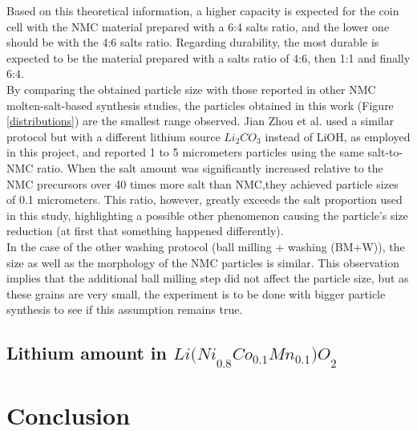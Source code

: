 \documentclass{article}
\begin{document}
Based on this theoretical information, a higher capacity is expected for the coin cell with the NMC material prepared with a 6:4 salts ratio, and the lower one should be with the 4:6 salts ratio. Regarding durability, the most durable is expected to be the material prepared with a salts ratio of 4:6, then 1:1 and finally 6:4.\\

By comparing the obtained particle size with those reported in other NMC molten-salt-based synthesis studies, the particles obtained in this work (Figure \ref{distributions}) are the smallest range observed. Jian Zhou et al. used a similar protocol but with a different lithium source \(Li_2CO_3\) instead of LiOH, as employed in this project, and reported 1 to 5 micrometers particles using the same salt-to-NMC ratio. When the salt amount was significantly increased relative to the NMC precursors over 40 times more salt than NMC,they achieved particle sizes of 0.1 micrometers. This ratio, however, greatly exceeds the salt proportion used in this study, highlighting a possible other phenomenon causing the particle's size reduction (at first that something happened differently)\cite{Jian}.\\

In the case of the other washing protocol (ball milling + washing (BM+W)), the size as well as the morphology of the NMC particles is similar. This observation implies that the additional ball milling step did not affect the particle size, but as these grains are very small, the experiment is  to be done with bigger particle synthesis to see if this assumption remains true.\\
\subsection{Lithium amount in  \({Li(Ni}_{0.8}{Co}_{0.1}{Mn}_{0.1}{)O}_{2}\)}

\section{Conclusion}
\end{document}
